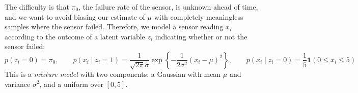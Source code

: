 The difficulty is that $\pi_0$, the failure rate of the sensor, is
unknown ahead of time, and we want to avoid biasing our estimate of
$\mu$ with completely meaningless samples where the sensor
failed. Therefore, we model a sensor reading $x_i$ according to the
outcome of a latent variable $z_i$ indicating whether or not the
sensor failed:
\begin{equation*}
  \label{eq:em-model}
  p(z_i = 0) = \pi_0,
  \qquad  p(x_i \mid z_i = 1) = \frac{1}{\sqrt{2\pi}\sigma} \exp \left\{ -\frac{1}{2\sigma^2}(x_i-\mu)^2 \right\},
  \qquad p(x_i \mid z_i = 0) = \frac{1}{5}\mathbf{1}(0\le x_{i}\le5)
\end{equation*}
This is a {\em mixture model} with two components: a Gaussian with
mean $\mu$ and variance $\sigma^2$, and a uniform over $[0,5]$.


